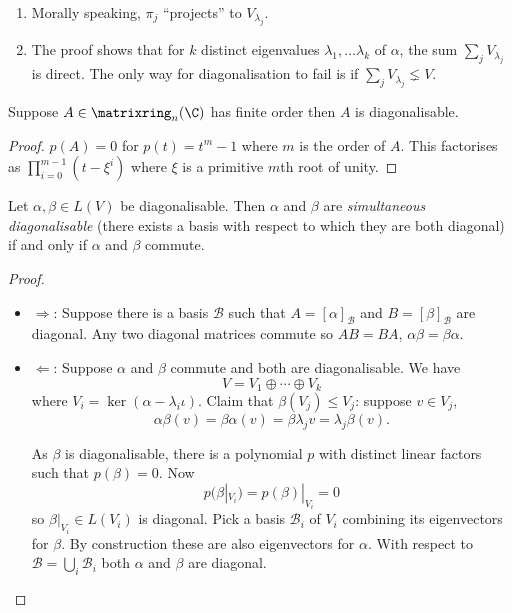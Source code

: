 \documentclass[a4paper]{article}
\newcommand*{\M}{\matrixring}
\newcommand*{\basis}{\mathcal}
\theoremstyle{definition}
\begin{document}
\begin{remark}\leavevmode
  \begin{enumerate}
  \item Morally speaking, \(\pi_j\) ``projects'' to \(V_{\lambda_j}\).
  \item The proof shows that for \(k\) distinct eigenvalues \(\lambda_1, \dots \lambda_k\) of \(\alpha\), the sum \(\sum_j V_{\lambda_j}\) is direct. The only way for diagonalisation to fail is if \(\sum_j V_{\lambda_j} \lneq V\).
  \end{enumerate}
\end{remark}

\begin{corollary}
  Suppose \(A \in \M_n(\C)\) has finite order then \(A\) is diagonalisable. 
\end{corollary}

\begin{proof}
  \(p(A) = 0\) for \(p(t) = t^m - 1\) where \(m\) is the order of \(A\). This factorises as \(\prod_{i = 0}^{m - 1} (t - \xi^i)\) where \(\xi\) is a primitive \(m\)th root of unity.
\end{proof}

\begin{theorem}
  Let \(\alpha, \beta \in L(V)\) be diagonalisable. Then \(\alpha\) and \(\beta\) are \emph{simultaneous diagonalisable} (there exists a basis with respect to which they are both diagonal) if and only if \(\alpha\) and \(\beta\) commute.
\end{theorem}

\begin{proof}\leavevmode
  \begin{itemize}
  \item \(\Rightarrow\): Suppose there is a basis \(\basis B\) such that \(A = [\alpha]_{\basis B}\) and \(B = [\beta]_{\basis B}\) are diagonal. Any two diagonal matrices commute so \(AB = BA\), \(\alpha\beta = \beta\alpha\).
  \item \(\Leftarrow\): Suppose \(\alpha\) and \(\beta\) commute and both are diagonalisable. We have
    \[
      V = V_1 \oplus \cdots \oplus V_k
    \]
    where \(V_i = \ker(\alpha - \lambda_i\iota)\). Claim that \(\beta(V_j) \leq V_j\): suppose \(v \in V_j\),
    \[
      \alpha\beta (v) = \beta\alpha (v) = \beta\lambda_j v = \lambda_j \beta(v).
    \]

    As \(\beta\) is diagonalisable, there is a polynomial \(p\) with distinct linear factors such that \(p(\beta) = 0\). Now
    \[
      p(\beta|_{V_i}) = p(\beta)|_{V_i} = 0
    \]
    so \(\beta|_{V_i} \in L(V_i)\) is diagonal. Pick a basis \(\basis B_i\) of \(V_i\) combining its eigenvectors for \(\beta\). By construction these are also eigenvectors for \(\alpha\). With respect to \(\basis B = \bigcup_i \basis B_i\) both \(\alpha\) and \(\beta\) are diagonal.
  \end{itemize}
\end{proof}
\end{document}
